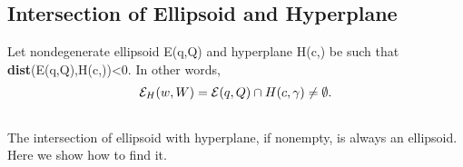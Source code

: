 \documentclass[letterpaper,10pt,english]{sphinxmanual}
\begin{document}
\subsection{Intersection of Ellipsoid and Hyperplane}
\label{chap_ellcalc:intersection-of-ellipsoid-and-hyperplane}
Let nondegenerate ellipsoid {\mathcal E}(q,Q) and hyperplane
H(c,\gamma) be such that
{\bf dist}({\mathcal E}(q,Q),H(c,\gamma))<0. In other words,
\begin{gather}
\begin{split}{\mathcal E}_H(w,W) = {\mathcal E}(q,Q)\cap H(c,\gamma) \neq \emptyset .\end{split}\notag\\\begin{split}\end{split}\notag
\end{gather}
The intersection of ellipsoid with hyperplane, if nonempty, is always
an ellipsoid. Here we show how to find it.
\end{document}

